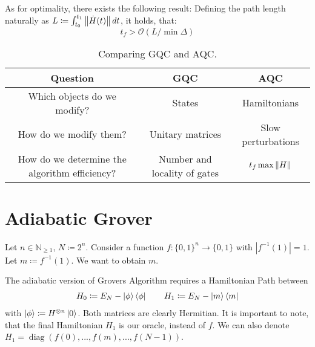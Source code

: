 \documentclass[10pt]{amsart}
\theoremstyle{definition}
\theoremstyle{remark}
\DeclareMathOperator{\diag}{diag}
\begin{document}
    As for optimality, there exists the following result: Defining the path length naturally as \(L \coloneqq \int_{t_0}^{t_1} \norm{\dot{H}(t)} \, dt\), it holds, that:
    \[
        t_f > \mathcal{O}(L/\min \Delta)
    \]

    \begin{table}[!hbtp]
        \begin{tabular}{c|c|c}
            Question & GQC & AQC\\
            \hline
            Which objects do we modify? & States & Hamiltonians\\
            How do we modify them? & Unitary matrices & Slow perturbations\\
            How do we determine the algorithm efficiency? & Number and locality of gates & \(t_f \max\norm{H}\)
        \end{tabular}

        \caption{Comparing GQC and AQC.}
    \end{table}

    \section{Adiabatic Grover}

    Let \(n \in \mathbb{N}_{\geq 1}\), \(N \coloneqq 2^n\). Consider a function \(f\colon \{0, 1\}^n \to \{0, 1\}\) with \(|f^{-1}(1)| = 1\). Let \(m \coloneqq f^{-1}(1)\). We want to obtain \(m\).

    The adiabatic version of Grovers Algorithm requires a Hamiltonian Path between
    \begin{align}
        H_0 \coloneqq E_N - \ket{\phi}\bra{\phi} \qquad H_1 \coloneqq E_N - \ket{m}\bra{m}
    \end{align}
    with \(\ket{\phi} \coloneqq H^{\otimes n}\ket{0}\). Both matrices are clearly Hermitian. It is important to note, that the final Hamiltonian \(H_1\) is our oracle, instead of \(f\). We can also denote \(H_1 = \diag(f(0), ..., f(m), ..., f(N-1))\).

    \phantom{}
    
\end{document}
